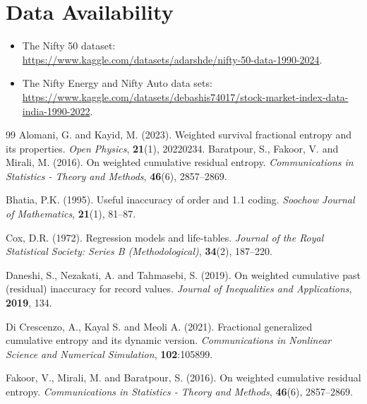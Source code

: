 \documentclass[12pt,a4paper]{article}
\numberwithin{equation}{section}
\begin{document}
\section*{Data Availability}
\footnotesize\begin{itemize}
	\item The Nifty 50 dataset:\\ \url{https://www.kaggle.com/datasets/adarshde/nifty-50-data-1990-2024}.
	
	\item	The Nifty Energy and Nifty Auto data sets:\\ \url{https://www.kaggle.com/datasets/debashis74017/stock-market-index-data-india-1990-2022}.
\end{itemize}
\begin{thebibliography}{99}
	 Alomani, G. and Kayid, M. (2023). Weighted survival fractional entropy and its properties. \textit{Open Physics}, \textbf{21}(1), 20220234.
	Baratpour, S., Fakoor, V. and Mirali, M. (2016).
	On weighted cumulative residual entropy.
	\textit{Communications in Statistics - Theory and Methods}, \textbf{46}(6), 2857--2869.
	
	
	Bhatia, P.K. (1995).
	Useful inaccuracy of order and 1.1 coding.
	\textit{Soochow Journal of Mathematics}, \textbf{21}(1), 81--87.
	
	Cox, D.R. (1972).
	Regression models and life-tables.
	\textit{Journal of the Royal Statistical Society: Series B (Methodological)}, \textbf{34}(2), 187--220.
	
	Daneshi, S., Nezakati, A. and Tahmasebi, S. (2019).
	On weighted cumulative past (residual) inaccuracy for record values.
	\textit{Journal of Inequalities and Applications}, \textbf{2019}, 134.
	
	 Di Crescenzo, A.,  Kayal S. and  Meoli A. (2021). Fractional generalized cumulative entropy and its dynamic version. \textit{Communications in Nonlinear Science and Numerical Simulation}, \textbf{102}:105899.
	
	Fakoor, V., Mirali, M. and Baratpour, S. (2016).
	On weighted cumulative residual entropy.
	\textit{Communications in Statistics - Theory and Methods}, \textbf{46}(6), 2857--2869.
	
	


\end{thebibliography}
\end{document}
